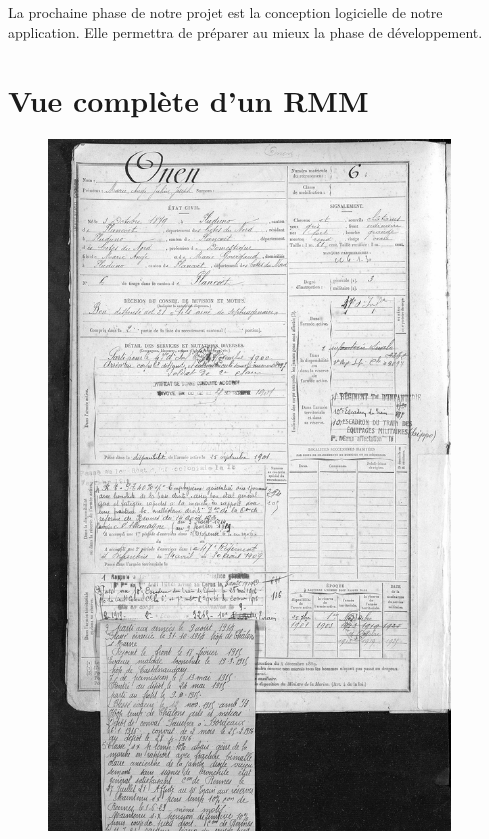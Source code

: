 \documentclass[a4paper]{article}
\begin{document}
	La prochaine phase de notre projet est la conception logicielle de notre application. Elle permettra de préparer au mieux la phase de développement.

\appendix

\section{Vue compl\`ete d'un RMM}
\label{sec:annexe 1}

\begin{figure}[H]
\centering
\includegraphics[width=0.95\textwidth]{RMM.JPG}
\end{figure}
\end{document}
